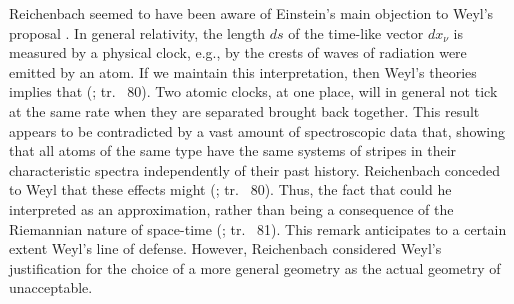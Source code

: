 \documentclass[draft]{article}
\newcommand{\rhp}[2]{(\cite[#1]{Reichenbach1920a}; tr.\ \citeyear{Reichenbach1969} #2)\xspace}
\begin{document}
Reichenbach seemed to have been aware of Einstein's main objection to Weyl's proposal \citep[see]{Einstein1918b}. In general relativity, the length $ds$ of the time-like vector $dx_\nu$ is measured by a physical clock, e.g., by the crests of waves of radiation were emitted by an atom. If we maintain this interpretation, then Weyl's theories implies that  \rhp{77}{80}. Two atomic clocks, at one place, will in general not tick at the same rate when they are separated brought back together. This result appears to be contradicted by a vast amount of spectroscopic data that, showing that all atoms of the same type have the same systems of stripes in their characteristic spectra independently of their past history. Reichenbach conceded to Weyl that these effects might  \rhp{77}{80}. Thus, the fact that  could he interpreted as an approximation, rather than being a consequence of the Riemannian nature of space-time \rhp{77}{81}. This remark anticipates to a certain extent Weyl's line of defense. However, Reichenbach considered Weyl's justification for the choice of a more general geometry as the actual geometry of \spti unacceptable.
\end{document}
